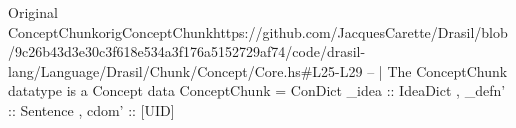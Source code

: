 \begin{haskell}{Original ConceptChunk}{origConceptChunk}{https://github.com/JacquesCarette/Drasil/blob/9c26b43d3e30c3f618e534a3f176a5152729af74/code/drasil-lang/Language/Drasil/Chunk/Concept/Core.hs\#L25-L29}
-- | The ConceptChunk datatype is a Concept
data ConceptChunk = ConDict { _idea :: IdeaDict
                            , _defn' :: Sentence
                            , cdom' :: [UID]
                            }
\end{haskell}
